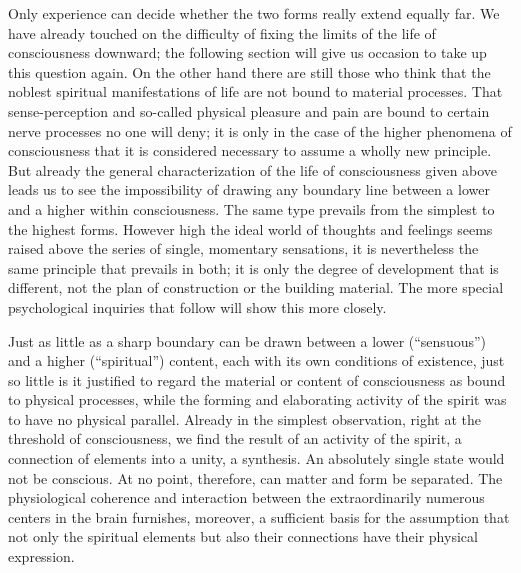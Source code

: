\documentclass[12pt,a4paper]{book}
\newcommand{\opage}[1]{\marginnote{\footnotesize\textit{[#1]}}}
\begin{document}
Only experience can decide whether the two forms really extend equally
far. We have already touched on the difficulty of fixing the limits of
the life of consciousness downward; the following section will give us
occasion to take up this question again. On the other hand there are
still those who think that the noblest spiritual manifestations of life
are not bound to material processes. That sense-perception and
so-called physical pleasure and pain are bound to certain nerve
processes no one will deny; it is only in the case of the higher
phenomena of consciousness that it is considered necessary to assume a
wholly new principle. But already the general characterization of the
life of consciousness given above leads us to see the impossibility of
drawing any boundary line between a lower and a higher within
consciousness. The same type prevails from the simplest to the highest
forms. However high the ideal world of thoughts and feelings
\opage{78}seems raised above the series of single, momentary sensations,
it is nevertheless the same principle that prevails in both; it is only
the degree of development that is different, not the plan of
construction or the building material. The more special psychological
inquiries that follow will show this more closely.

Just as little as a sharp boundary can be drawn between a lower
(``sensuous'') and a higher (``spiritual'') content, each with its own
conditions of existence, just so little is it justified to regard the
material or content of consciousness as bound to physical processes,
while the forming and elaborating activity of the spirit was to have no
physical parallel. Already in the simplest observation, right at the
threshold of consciousness, we find the result of an activity of the
spirit, a connection of elements into a unity, a synthesis. An absolutely
single state would not be conscious. At no point, therefore, can matter
and form be separated. The physiological coherence and interaction
between the extraordinarily numerous centers in the brain furnishes,
moreover, a sufficient basis for the assumption that not only the
spiritual elements but also their connections have their physical
expression.
\end{document}
